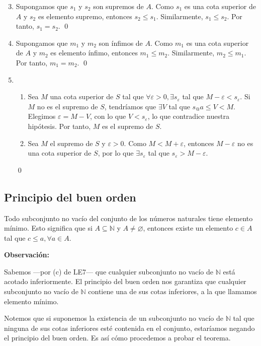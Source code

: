 \documentclass[11pt]{article}
\newcommand{\N}{\mathbb{N}}
\let\epsilon\varepsilon
\let\emptyset\varnothing
\begin{document}
\begin{enumerate}[label=\arabic*.]\setcounter{enumi}{2}
    \item Supongamos que $s_1$ y $s_2$ son supremos de $A$. Como $s_1$ es una cota superior de $A$ y $s_2$ es elemento supremo, entonces $s_2\leq s_1$. Similarmente, $s_1\leq s_2$. Por tanto, $s_1=s_2$. \qed
    \item Supongamos que $m_1$ y $m_2$ son ínfimos de $A$. Como $m_1$ es una cota superior de $A$ y $m_2$ es elemento ínfimo, entonces $m_1\leq m_2$. Similarmente, $m_2\leq m_1$. Por tanto, $m_1=m_2$. \qed
    \item \begin{enumerate}[label=\roman*)]
        \item Sea $M$ una cota superior de $S$ tal que $\forall \epsilon>0, \exists s_{\epsilon}$ tal que $M-\epsilon<s_{\epsilon}$. Si $M$ no es el supremo de $S$, tendríamos que $\exists V$ tal que $s_@a \leq V < M$. Elegimos $\epsilon = M-V$, con lo que $V<s_{\epsilon}$, lo que contradice nuestra hipótesis. Por tanto, $M$ es el supremo de $S$.
        \item Sea $M$ el supremo de $S$ y $\epsilon>0$. Como $M<M+\epsilon$, entonces $M-\epsilon$ no es una cota superior de $S$, por lo que $\exists s_\epsilon$ tal que $s_\epsilon>M-\epsilon$.
        \end{enumerate}
        \qed
\end{enumerate}

\subsection*{Principio del buen orden}

Todo subconjunto no vacío del conjunto de los números naturales tiene elemento mínimo. Esto significa que si $A\subseteq \N$ y $A \neq \emptyset$, entonces existe un elemento $c\in A$ tal que $c\leq a, \forall a\in A$.

\textbf{Observación:}

Sabemos —por (c) de LE7— que cualquier subconjunto no vacío de $\N$ está acotado inferiormente. El principio del buen orden nos garantiza que cualquier subconjunto no vacío de $\N$ contiene una de sus cotas inferiores, a la que llamamos elemento mínimo.

Notemos que si suponemos la existencia de un subconjunto no vacío de $\N$ tal que ninguna de sus cotas inferiores esté contenida en el conjunto, estaríamos negando el principio del buen orden. Es así cómo procedemos a probar el teorema.
\end{document}
